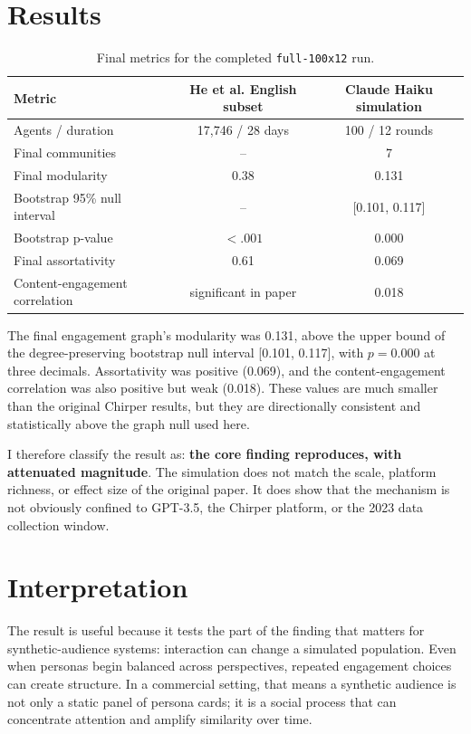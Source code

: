 \documentclass[10pt]{article}
\begin{document}
\section*{Results}

\begin{table}[h]
\centering
\begin{tabular}{lcc}
\toprule
Metric & He et al. English subset & Claude Haiku simulation \\
\midrule
Agents / duration & 17,746 / 28 days & 100 / 12 rounds \\
Final communities & -- & 7 \\
Final modularity & 0.38 & 0.131 \\
Bootstrap 95\% null interval & -- & [0.101, 0.117] \\
Bootstrap p-value & $< .001$ & 0.000 \\
Final assortativity & 0.61 & 0.069 \\
Content-engagement correlation & significant in paper & 0.018 \\
\bottomrule
\end{tabular}
\caption{Final metrics for the completed \texttt{full-100x12} run.}
\end{table}

The final engagement graph's modularity was 0.131, above the upper bound of the degree-preserving bootstrap null interval [0.101, 0.117], with $p = 0.000$ at three decimals. Assortativity was positive (0.069), and the content-engagement correlation was also positive but weak (0.018). These values are much smaller than the original Chirper results, but they are directionally consistent and statistically above the graph null used here.

I therefore classify the result as: \textbf{the core finding reproduces, with attenuated magnitude}. The simulation does not match the scale, platform richness, or effect size of the original paper. It does show that the mechanism is not obviously confined to GPT-3.5, the Chirper platform, or the 2023 data collection window.

\section*{Interpretation}

The result is useful because it tests the part of the finding that matters for synthetic-audience systems: interaction can change a simulated population. Even when personas begin balanced across perspectives, repeated engagement choices can create structure. In a commercial setting, that means a synthetic audience is not only a static panel of persona cards; it is a social process that can concentrate attention and amplify similarity over time.
\end{document}
